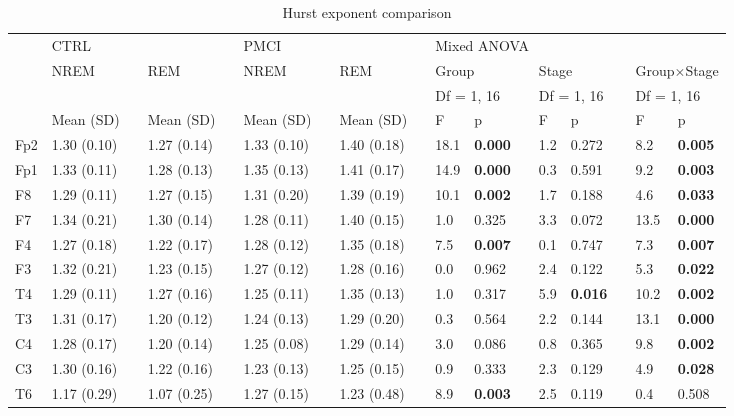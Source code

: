 \documentclass[10pt]{article}
\begin{document}
\begin{table}
\caption{Hurst exponent comparison}
\begin{small}
\begin{tabular}{lllllllllllllllll}
\toprule
 & \multicolumn{3}{l}{CTRL} & \phantom{.}  & \multicolumn{3}{l}{PMCI} & \phantom{.} & \multicolumn{8}{l}{Mixed ANOVA} \\
\cmidrule{2-4} \cmidrule{6-8} \cmidrule{10-17}
 & NREM &  & REM   & & NREM &  & REM  &  & 
   \multicolumn{2}{l}{Group} &  & \multicolumn{2}{l}{Stage} & & \multicolumn{2}{l}{Group$\times$Stage}  \\
 &&&&&&&&& \multicolumn{2}{l}{Df = 1, 16} &  &  \multicolumn{2}{l}{Df = 1, 16}  &  &  \multicolumn{2}{l}{Df = 1, 16}  \\
\cmidrule{2-2} \cmidrule{4-4} \cmidrule{6-6} \cmidrule{8-8} \cmidrule{10-11} \cmidrule{13-14} \cmidrule{16-17}    
 & Mean (SD) &  & Mean (SD) &  & Mean (SD) &  & Mean (SD) &  & F & p &  & F & p &  & F & p \\
\midrule
Fp2&1.30 (0.10)&&1.27 (0.14) &&1.33 (0.10) &&1.40 (0.18) &&18.1&\bf 0.000&&1.2&0.272&&8.2&\bf 0.005
 \\
Fp1&1.33 (0.11)&&1.28 (0.13) &&1.35 (0.13) &&1.41 (0.17) &&14.9&\bf 0.000&&0.3&0.591&&9.2&\bf 0.003
 \\
F8&1.29 (0.11) &&1.27 (0.15) &&1.31 (0.20) &&1.39 (0.19) &&10.1&\bf 0.002&&1.7&0.188&&4.6&\bf 0.033
 \\
F7&1.34 (0.21) &&1.30 (0.14) &&1.28 (0.11) &&1.40 (0.15) &&1.0 &    0.325&&3.3&0.072&&13.5&\bf 0.000
 \\
F4&1.27 (0.18) &&1.22 (0.17) &&1.28 (0.12) &&1.35 (0.18) &&7.5 &\bf 0.007&&0.1&0.747&&7.3&\bf 0.007
 \\
F3&1.32 (0.21) &&1.23 (0.15) &&1.27 (0.12) &&1.28 (0.16) &&0.0 &    0.962&&2.4&0.122&&5.3&\bf 0.022
 \\
T4&1.29 (0.11) &&1.27 (0.16) &&1.25 (0.11) &&1.35 (0.13) &&1.0 &    0.317&&5.9&\bf 0.016&&10.2&\bf 0.002
 \\
T3&1.31 (0.17) &&1.20 (0.12) &&1.24 (0.13) &&1.29 (0.20) &&0.3 &    0.564&&2.2&0.144&&13.1&\bf 0.000
 \\
C4&1.28 (0.17) &&1.20 (0.14) &&1.25 (0.08) &&1.29 (0.14) &&3.0 &    0.086&&0.8&0.365&&9.8&\bf 0.002
 \\
C3&1.30 (0.16) &&1.22 (0.16) &&1.23 (0.13) &&1.25 (0.15) &&0.9 &    0.333&&2.3&0.129&&4.9&\bf 0.028
 \\
T6&1.17 (0.29) &&1.07 (0.25) &&1.27 (0.15) &&1.23 (0.48) &&8.9 &\bf 0.003&&2.5&0.119&&0.4&0.508
 \\

\end{tabular}
\end{small}
\end{table}
\end{document}

